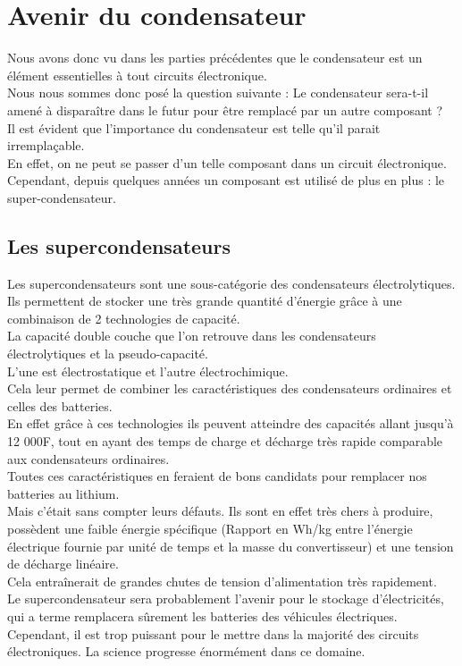 \chapter{Avenir du condensateur}

Nous avons donc vu dans les parties précédentes que le condensateur est un élément essentielles à tout circuits électronique. \\
Nous nous sommes donc posé la question suivante : Le condensateur sera-t-il amené à disparaître dans le futur pour être remplacé par un autre composant ? \\

Il est évident que l'importance du condensateur est telle qu'il parait irremplaçable. \\ 
En effet, on ne peut se passer d'un telle composant dans un circuit électronique.\\
 Cependant, depuis quelques années un composant est utilisé de plus en plus : le super-condensateur. \\

\section{Les supercondensateurs}

Les supercondensateurs sont une sous-catégorie des condensateurs électrolytiques.\\ 
Ils permettent de stocker une très grande quantité d’énergie grâce à une combinaison de 2 technologies de capacité. \\

La capacité double couche que l’on retrouve dans les condensateurs électrolytiques et la pseudo-capacité. \\
L’une est électrostatique et l’autre électrochimique.\\


Cela leur permet de combiner les caractéristiques des condensateurs ordinaires et celles des batteries.\\ 
En effet grâce à ces technologies ils peuvent atteindre des capacités allant jusqu’à 12 000F, tout en ayant des temps de charge et décharge très rapide comparable aux condensateurs ordinaires.\\
 Toutes ces caractéristiques en feraient de bons candidats pour remplacer nos batteries au lithium.\\
 
 Mais c’était sans compter leurs défauts. Ils sont en effet très chers à produire, possèdent une faible énergie spécifique (Rapport en Wh/kg entre l’énergie électrique fournie par unité de temps et la masse du convertisseur) et une tension de décharge linéaire.\\
 Cela entraînerait de grandes chutes de tension d’alimentation très rapidement.\\

Le supercondensateur sera probablement l'avenir pour le stockage d'électricités, qui a terme remplacera sûrement les batteries des véhicules électriques.\\

Cependant, il est trop puissant pour le mettre dans la majorité des circuits électroniques. La science progresse énormément dans ce domaine.
